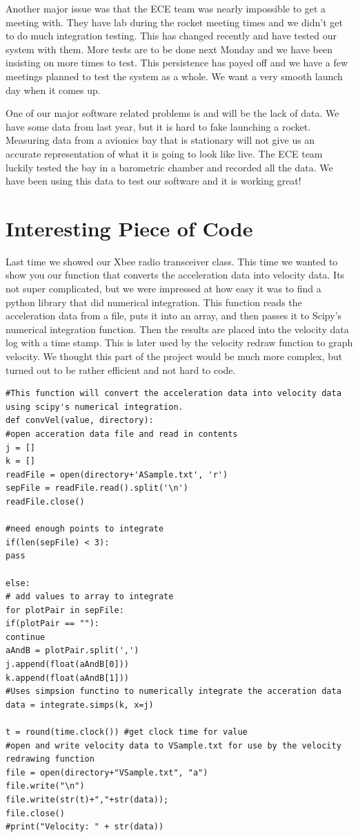 \documentclass[10pt,draftclsnofoot,onecolumn]{IEEEtran}
\begin{document}
Another major issue was that the ECE team was nearly impossible to get a meeting with. They have lab during the rocket meeting times and we didn't get to do much integration testing. This has changed recently and have tested our system with them. More tests are to be done next Monday and we have been insisting on more times to test. This persistence has payed off and we have a few meetings planned to test the system as a whole. We want a very smooth launch day when it comes up. \par

One of our major software related problems is and will be the lack of data. We have some data from last year, but it is hard to fake launching a rocket. Measuring data from a avionics bay that is stationary will not give us an accurate representation of what it is going to look like live. The ECE team luckily tested the bay in a barometric chamber and recorded all the data. We have been using this data to test our software and it is working great! \par

\pagebreak
\section{Interesting Piece of Code}
Last time we showed our Xbee radio transceiver class. This time we wanted to show you our function that converts the acceleration data into velocity data. Its not super complicated, but we were impressed at how easy it was to find a python library that did numerical integration. This function reads the acceleration data from a file, puts it into an array, and then passes it to Scipy's numerical integration function. Then the results are placed into the velocity data log with a time stamp. This is later used by the velocity redraw function to graph velocity. We thought this part of the project would be much more complex, but turned out to be rather efficient and not hard to code. \par

\begin{lstlisting}
#This function will convert the acceleration data into velocity data using scipy's numerical integration.
def convVel(value, directory):
#open acceration data file and read in contents
j = []
k = []
readFile = open(directory+'ASample.txt', 'r')
sepFile = readFile.read().split('\n')
readFile.close()

#need enough points to integrate
if(len(sepFile) < 3):
pass

else:
# add values to array to integrate
for plotPair in sepFile:
if(plotPair == ""):
continue
aAndB = plotPair.split(',')
j.append(float(aAndB[0]))
k.append(float(aAndB[1]))
#Uses simpsion functino to numerically integrate the acceration data
data = integrate.simps(k, x=j)

t = round(time.clock()) #get clock time for value
#open and write velocity data to VSample.txt for use by the velocity redrawing function
file = open(directory+"VSample.txt", "a")
file.write("\n")
file.write(str(t)+","+str(data)); 
file.close()
#print("Velocity: " + str(data))

\end{lstlisting}
\pagebreak
\end{document}
